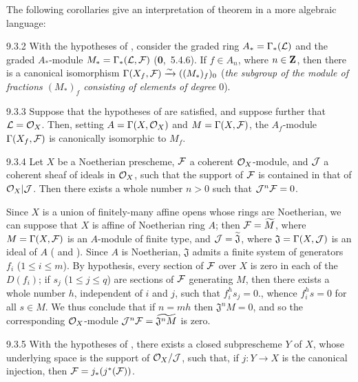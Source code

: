 The following corollaries give an interpretation of theorem  in a more algebraic
language:

\begin{env}[Corollary]{9.3.2}
With the hypotheses of , consider the graded ring $A_\ast=\Gamma_\ast(\mathcal{L})$
and the graded $A_\ast$-module $M_\ast=\Gamma_\ast(\mathcal{L},\mathcal{F})$
{\normalfont(\textbf{0},~5.4.6)}. If $f\in A_n$, where $n\in\mathbf{Z}$, then there is
a canonical isomorphism $\Gamma(X_f,\mathcal{F})\xrightarrow{\sim}((M_\ast)_f)_0$
(\emph{the subgroup of the module of fractions $(M_\ast)_f$ consisting of elements of degree
$0$}).
\end{env}

\begin{env}[Corollary]{9.3.3}
Suppose that the hypotheses of  are satisfied, and suppose further that
$\mathcal{L}=\mathcal{O}_X$. Then, setting $A=\Gamma(X,\mathcal{O}_X)$ and $M=\Gamma(X,\mathcal{F})$,
the $A_f$-module $\Gamma(X_f,\mathcal{F})$ is canonically isomorphic to $M_f$.
\end{env}

\begin{env}[Proposition]{9.3.4}
Let $X$ be a Noetherian prescheme, $\mathcal{F}$ a coherent $\mathcal{O}_X$-module, and $\mathcal{J}$ a
coherent sheaf of ideals in $\mathcal{O}_X$, such that the support of $\mathcal{F}$ is contained in that
of $\mathcal{O}_X|\mathcal{J}$. Then there exists a whole number $n>0$ such that $\mathcal{J}^n\mathcal{F}=0$.
\end{env}

Since $X$ is a union of finitely-many affine opens whose rings are Noetherian, we can suppose
that $X$ is affine of Noetherian ring $A$; then $\mathcal{F}=\widetilde{M}$, where
$M=\Gamma(X,\mathcal{F})$ is an $A$-module of finite type, and $\mathcal{J}=\widetilde{\mathfrak{J}}$,
where $\mathfrak{J}=\Gamma(X,\mathcal{J})$ is an ideal of $A$ ( and ).
Since $A$ is Noetherian, $\mathfrak{J}$ admits a finite system of generators $f_i$ ($1\leq i\leq m$).
By hypothesis, every section of $\mathcal{F}$ over $X$ is zero in each of the $D(f_i)$; if $s_j$
($1\leq j\leq q$) are sections of $\mathcal{F}$ generating $M$, then there exists a whole number
$h$, independent of $i$ and $j$, such that $f_i^h s_j=0$., whence $f_i^h s=0$ for all
$s\in M$. We thus conclude that if $n=mh$ then $\mathfrak{J}^n M=0$, and so the corresponding
$\mathcal{O}_X$-module $\mathcal{J}^n\mathcal{F}=\widetilde{\mathfrak{J}^n M}$  is zero.

\begin{env}[Corollary]{9.3.5}
With the hypotheses of , there exists a closed subprescheme $Y$ of $X$, whose
underlying space is the support of $\mathcal{O}_X/\mathcal{J}$, such that, if $j\colon Y\to X$ is the canonical
injection, then $\mathcal{F}=j_\ast(j^\ast(\mathcal{F}))$.
\end{env}


